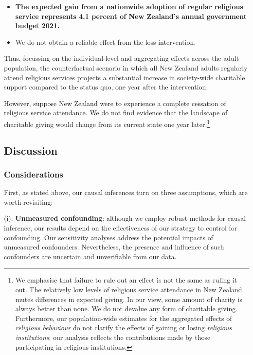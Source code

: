 \documentclass[
  single column]{article}
\providecommand{\tightlist}{%
  \setlength{\itemsep}{0pt}\setlength{\parskip}{0pt}}\usepackage{longtable,booktabs,array}
\begin{document}
\begin{itemize}
\tightlist
\item
  \textbf{The expected gain from a nationwide adoption of regular
  religious service represents 4.1 percent of New Zealand's annual
  government budget 2021.}
\item
  We do not obtain a reliable effect from the loss intervention.
\end{itemize}

Thus, focussing on the individual-level and aggregating effects across
the adult population, the counterfactual scenario in which all New
Zealand adults regularly attend religious services projects a
substantial increase in society-wide charitable support compared to the
status quo, one year after the intervention.

However, suppose New Zealand were to experience a complete cessation of
religious service attendance. We do not find evidence that the landscape
of charitable giving would change from its current state one year
later.\footnote{We emphasise that failure to rule out an effect is not
  the same as ruling it out. The relatively low levels of religious
  service attendance in New Zealand mutes differences in expected
  giving. In our view, some amount of charity is always better than
  none. We do not devalue any form of charitable giving. Furthermore,
  our population-wide estimates for the aggregated effects of
  \emph{religious behaviour} do not clarify the effects of gaining or
  losing \emph{religious institutions}; our analysis reflects the
  contributions made by those participating in religious institutions.}

\subsection{Discussion}\label{discussion}

\subsubsection{Considerations}\label{considerations}

First, as stated above, our causal inferences turn on three assumptions,
which are worth revisiting:

(i). \textbf{Unmeasured confounding}: although we employ robust methods
for causal inference, our results depend on the effectiveness of our
strategy to control for confounding. Our sensitivity analyses address
the potential impacts of unmeasured confounders. Nevertheless, the
presence and influence of such confounders are uncertain and
unverifiable from our data.
\end{document}
